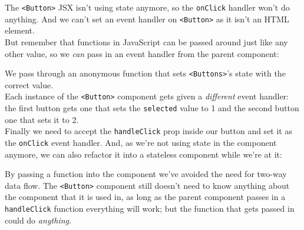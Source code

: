 The \texttt{<Button>} JSX isn't using state anymore, so the \texttt{onClick} handler won't do anything. And we can't set an event handler on \texttt{<Button>} as it isn't an HTML element.
\\

But remember that functions in JavaScript can be passed around just like any other value, so we \textit{can} pass in an event handler from the parent component:


We pass through an anonymous function that sets \texttt{<Buttons>}'s state with the correct value.
\\

Each instance of the \texttt{<Button>} component gets given a \textit{different} event handler: the first button gets one that sets the \texttt{selected} value to 1 and the second button one that sets it to 2.
\\

Finally we need to accept the \texttt{handleClick} prop inside our button and set it as the \texttt{onClick} event handler. And, as we're not using state in the component anymore, we can also refactor it into a stateless component while we're at it:


By passing a function into the component we've avoided the need for two-way data flow. The \texttt{<Button>} component still doesn't need to know anything about the component that it is used in, as long as the parent component passes in a \texttt{handleClick} function everything will work; but the function that gets passed in could do \textit{anything}.
